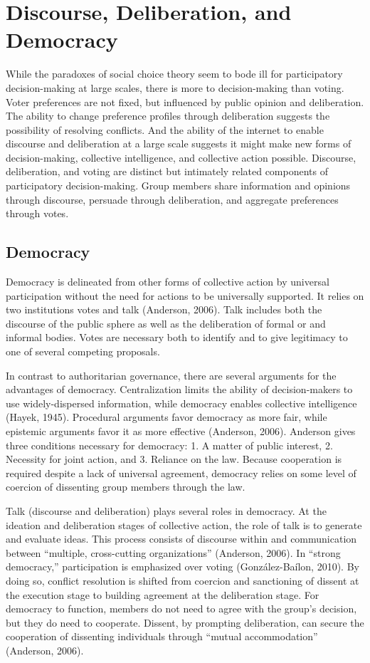 \section{Discourse, Deliberation, and Democracy}
While the paradoxes of social choice theory seem to bode ill for participatory decision-making at large scales, there is more to decision-making than voting. Voter preferences are not fixed, but influenced by public opinion and deliberation. The ability to change preference profiles through deliberation suggests the possibility of resolving conflicts. And the ability of the internet to enable discourse and deliberation at a large scale suggests it might make new forms of decision-making, collective intelligence, and collective action possible. Discourse, deliberation, and voting are distinct but intimately related components of participatory decision-making. Group members share information and opinions through discourse, persuade through deliberation, and aggregate preferences through votes.

\subsection{Democracy}
Democracy is delineated from other forms of collective action by universal participation without the need for actions to be universally supported. It relies on two institutions votes and talk (Anderson, 2006). Talk includes both the discourse of the public sphere as well as the deliberation of formal or and informal bodies. Votes are necessary both to identify and to give legitimacy to one of several competing proposals.

In contrast to authoritarian governance, there are several arguments for the advantages of democracy. Centralization limits the ability of decision-makers to use widely-dispersed information, while democracy enables collective intelligence (Hayek, 1945). Procedural arguments favor democracy as more fair, while epistemic arguments favor it as more effective (Anderson, 2006). Anderson gives three conditions necessary for democracy: 1. A matter of public interest, 2. Necessity for joint action, and 3. Reliance on the law. Because cooperation is required despite a lack of universal agreement, democracy relies on some level of coercion of dissenting group members through the law.

Talk (discourse and deliberation) plays several roles in democracy. At the ideation and deliberation stages of collective action, the  role of talk is to generate and evaluate ideas. This process consists of discourse within and communication between “multiple, cross-cutting organizations” (Anderson, 2006). In “strong democracy,” participation is emphasized over voting (Gonz\'alez-Ba\'ilon, 2010). By doing so, conflict resolution is shifted from coercion and sanctioning of dissent at the execution stage to building agreement at the deliberation stage. For democracy to function, members do not need to agree with the group’s decision, but they do need to cooperate. Dissent, by prompting deliberation, can secure the cooperation of dissenting individuals through “mutual accommodation” (Anderson, 2006).

